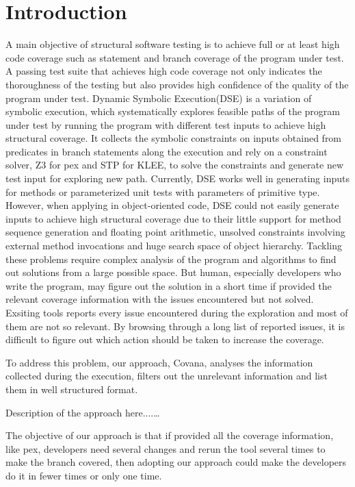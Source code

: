 \section{Introduction}
A main objective of structural software testing is to achieve full or at least high code coverage such as statement and branch coverage of the program under test. A passing test suite that achieves high code coverage not only indicates the thoroughness of the testing but also provides high confidence of the quality of the program under test. Dynamic Symbolic Execution(DSE) is a variation of symbolic execution, which systematically explores feasible paths of the program under test by running the program with different test inputs to achieve high structural coverage. It collects the symbolic constraints on inputs obtained from predicates in branch statements along the execution and rely on a constraint solver, Z3 for pex and STP for KLEE, to solve the constraints and generate new test input for exploring new path. Currently, DSE works well in generating inputs for methods or parameterized unit tests with parameters of primitive type. However, when applying in  object-oriented code, DSE could not easily generate inputs to achieve high structural coverage due to their little support for method sequence generation and floating point arithmetic, unsolved constraints involving external method invocations and huge search space of object hierarchy. Tackling these problems require complex analysis of the program and algorithms to find out solutions from a large possible space. But human, especially developers who write the program, may figure out the solution in a short time if provided the relevant coverage information with the issues encountered but not solved. Exsiting tools reports every issue encountered during the exploration and most of them are not so relevant. By browsing through a long list of reported issues, it is difficult to figure out which action should be taken to increase the coverage. 

To address this problem, our approach, Covana, analyses the information collected during the execution, filters out the unrelevant information and list them in well structured format. 

Description of the approach here....\dots

The objective of our approach is that if provided all the coverage information, like pex, developers need several changes and rerun the tool several times to make the branch covered, then adopting our approach could make the developers do it in fewer times or only one time.

